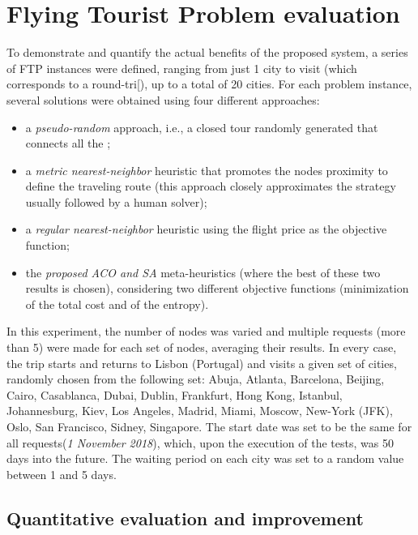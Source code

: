 \section{Flying Tourist Problem evaluation}
\label{sec:ftp_eval}

To demonstrate and quantify the actual benefits of the proposed system, a series of FTP instances were defined, ranging from just 1 city to visit (which corresponds to a round-tri[), up to a total of 20 cities. For each problem instance, several solutions were obtained using four different approaches:
\begin{itemize}
    \item a \textit{pseudo-random} approach, i.e., a closed tour randomly generated that connects all the ;
    \item a \textit{metric nearest-neighbor} heuristic that promotes the nodes proximity to define the traveling route (this approach closely approximates the strategy usually followed by a human solver);
    \item a \textit{regular nearest-neighbor} heuristic using the flight price as the objective function;
    \item the \textit{proposed ACO and SA} meta-heuristics (where the best of these two results is chosen), considering two different objective functions (minimization of the total cost and of the entropy). 
\end{itemize}  

In this experiment, the number of nodes was varied and multiple requests (more than 5) were made for each set of nodes, averaging their results.
In every case, the trip starts and returns to Lisbon (Portugal) and visits a given set of cities, randomly chosen from the following set: 
Abuja, Atlanta, Barcelona, Beijing, Cairo, Casablanca, Dubai, Dublin, Frankfurt, Hong Kong, Istanbul, 
Johannesburg, Kiev, Los Angeles, Madrid, Miami, Moscow, New-York (JFK), Oslo, San Francisco, Sidney, Singapore. The start date was set to be the same for all requests(\textit{1 November 2018}), which, upon the execution of the tests, was 50 days into the future. The waiting period on each city was set to a random value between 1 and 5 days. 


\subsection{Quantitative evaluation and improvement}
\label{sec:ftp_quantitative_eval}

